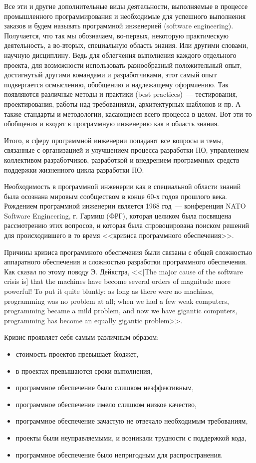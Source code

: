 \documentclass{../../text-style}
\begin{document}
Все эти и другие дополнительные виды деятельности, выполняемые в процессе промышленного программирования и необходимые для успешного выполнения заказов и будем называть программной инженерией (software engineering). Получается, что так мы обозначаем, во-первых, некоторую практическую деятельность, а во-вторых, специальную область знания. Или другими словами, научную дисциплину. Ведь для облегчения выполнения каждого отдельного проекта, для возможности использовать разнообразный положительный опыт, достигнутый другими командами и разработчиками, этот самый опыт подвергается осмыслению, обобщению и надлежащему оформлению. Так появляются различные методы и практики (best practices)~--- тестирования, проектирования, работы над требованиями, архитектурных шаблонов и пр. А также стандарты и методологии, касающиеся всего процесса в целом. Вот эти-то обобщения и входят в программную инженерию как в область знания.

Итого, в сферу программной инженерии попадают все вопросы и темы, связанные с организацией и улучшением процесса разработки ПО, управлением коллективом разработчиков, разработкой и внедрением программных средств поддержки жизненного цикла разработки ПО. 

Необходимость в программной инженерии как в специальной области знаний была осознана мировым сообществом в конце 60-х годов прошлого века. Рождением программной инженерии является 1968 год~--- конференция NATO Software Engineering, г. Гармиш (ФРГ), которая целиком была посвящена рассмотрению этих вопросов, и которая была спровоцирована поиском решений для происходившего в то время <<кризиса программного обеспечения>>.

Причины кризиса программного обеспечения были связаны с общей сложностью аппаратного обеспечения и сложностью разработки программного обеспечения. Как сказал по этому поводу Э. Дейкстра, <<[The major cause of the software crisis is] that the machines have become several orders of magnitude more powerful! To put it quite bluntly: as long as there were no machines, programming was no problem at all; when we had a few weak computers, programming became a mild problem, and now we have gigantic computers, programming has become an equally gigantic problem>>.

Кризис проявляет себя самым различным образом:
\begin{itemize}
    \item стоимость проектов превышает бюджет,
    \item в проектах превышаются сроки выполнения,
    \item программное обеспечение было слишком неэффективным,
    \item программное обеспечение имело слишком низкое качество,
    \item программное обеспечение зачастую не отвечало необходимым требованиям,
    \item проекты были неуправляемыми, и возникали трудности с поддержкой кода,
    \item программное обеспечение было непригодным для распространения.
\end{itemize}
\end{document}
